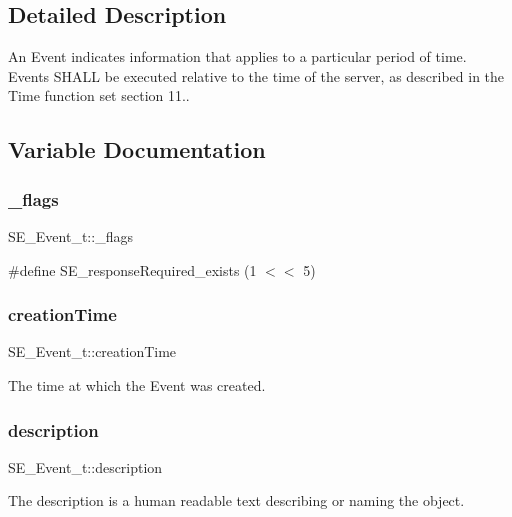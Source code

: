 \subsection{Detailed Description}
An Event indicates information that applies to a particular period of time. Events S\+H\+A\+LL be executed relative to the time of the server, as described in the Time function set section 11.. 

\subsection{Variable Documentation}
\mbox{\label{group__Event_gac9829e2ed56cc6d533951c5829a06447}} 
\subsubsection{\texorpdfstring{\+\_\+flags}{\_flags}}
{\footnotesize\ttfamily S\+E\+\_\+\+Event\+\_\+t\+::\+\_\+flags}

\#define S\+E\+\_\+response\+Required\+\_\+exists (1 $<$$<$ 5) \mbox{\label{group__Event_gaf230dbf11dcdc46c1f94be114028033f}} 
\subsubsection{\texorpdfstring{creation\+Time}{creationTime}}
{\footnotesize\ttfamily S\+E\+\_\+\+Event\+\_\+t\+::creation\+Time}

The time at which the Event was created. \mbox{\label{group__Event_gae4f20895ab9cd471d8b83c6a44f936fe}} 
\subsubsection{\texorpdfstring{description}{description}}
{\footnotesize\ttfamily S\+E\+\_\+\+Event\+\_\+t\+::description}

The description is a human readable text describing or naming the object. \mbox{\label{group__Event_gab778833a8a3a8f65c71ed89d477ffd26}} 
